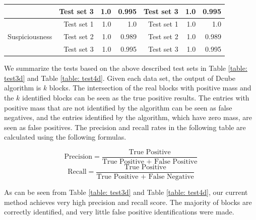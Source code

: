 \begin{table}[h]
\begin{tabular}{|r|r|r|r|r|r|r|}
                                                                                                                                 & Test set 3                   & 1.0                            & 0.995                       & Test set 3                   & 1.0                            & 0.995                       \\ \hline
\multirow{3}{*}{Suspiciousness}                                                                                                  & Test set 1                   & 1.0                            & 1.0                         & Test set 1                   & 1.0                            & 1.0                         \\ \cline{2-7} 
                                                                                                                                 & Test set 2                   & 1.0                            & 0.989                       & Test set 2                   & 1.0                            & 0.989                       \\ \cline{2-7} 
                                                                                                                                 & Test set 3                   & 1.0                            & 0.995                       & Test set 3                   & 1.0                            & 0.995                       \\ \hline
\end{tabular}
\end{table}
We summarize the tests based on the above described test sets in Table \ref{table: test3d} and Table \ref{table: test4d}. Given each data set, the output of Dcube algorithm is $k$ blocks. The intersection of the real blocks with positive mass and the $k$ identified blocks can be seen as the true positive results. The entries with positive mass that are not identified by the algorithm can be seen as false negatives, and the entries identified by the algorithm, which have zero mass, are seen as false positives. The precision and recall rates in the following table are calculated using the following formulas.

$$\text{Precision} = \frac{\text{True Positive}}{\text{True Positive + False Positive}}$$
$$\text{Recall} = \frac{\text{True Positive}}{\text{True Positive + False Negative}}$$

As can be seen from Table \ref{table: test3d} and Table \ref{table: test4d}, our current method achieves very high precision and recall score. The majority of blocks are correctly identified, and very little false positive identifications were made.

